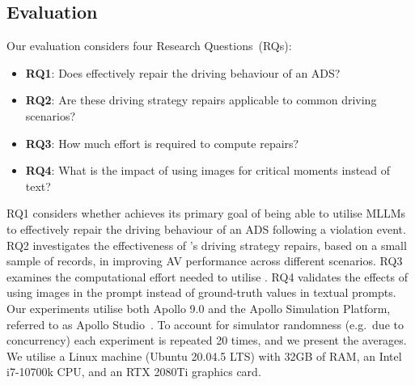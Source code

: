 \subsection{Evaluation}
Our evaluation considers four Research Questions~(RQs):


\begin{itemize}
    \item \noindent \textbf{RQ1}: Does \coolname effectively repair the driving behaviour of an ADS?
    \item \noindent \textbf{RQ2}: Are these driving strategy repairs applicable to common driving scenarios?
    \item \noindent \textbf{RQ3}: How much effort is required to compute repairs?
    \item \noindent \textbf{RQ4}: What is the impact of using images for critical moments instead of text?
\end{itemize}
RQ1 considers whether \coolname achieves its primary goal of being able to utilise MLLMs to effectively repair the driving behaviour of an ADS following a violation event.
RQ2 investigates the effectiveness of \coolname's driving strategy repairs, based on a small sample of records, in improving AV performance across different scenarios. 
RQ3 examines the computational effort needed to utilise \coolname.
RQ4 validates the effects of using images in the prompt instead of ground-truth values in textual prompts.
Our experiments utilise both Apollo 9.0 and the Apollo Simulation Platform, referred to as Apollo Studio~\cite{Apollostudio}. To account for simulator randomness (e.g.~due to concurrency) each experiment is repeated 20 times, and we present the averages. 
We utilise a Linux machine (Ubuntu 20.04.5 LTS) with 32GB of RAM, an Intel i7-10700k CPU, and an RTX 2080Ti graphics card.


